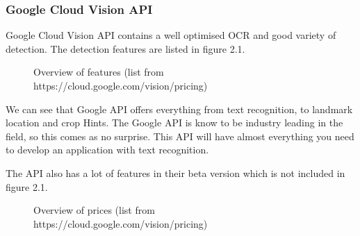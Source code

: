 \subsubsection{Google Cloud Vision API}\label{subsubsec:API_Google}

Google Cloud Vision API contains a well optimised OCR and good variety of detection.
The detection features are listed in figure 2.1.

\begin{figure}[h]
    \caption{Overview of features (list from https://cloud.google.com/vision/pricing)}
    \label{fig:figure2.1}

\end{figure}

We can see that Google API offers everything from text recognition, to landmark location and crop Hints.
The Google API is know to be industry leading in the field, so this comes as no surprise.
This API will have almost everything you need to develop an application with text recognition.

The API also has a lot of features in their beta version which is not included in figure 2.1.
\clearpage

\begin{figure}[h]
    \caption{Overview of prices (list from https://cloud.google.com/vision/pricing)}
    \label{fig:figure2.2}

\end{figure}

